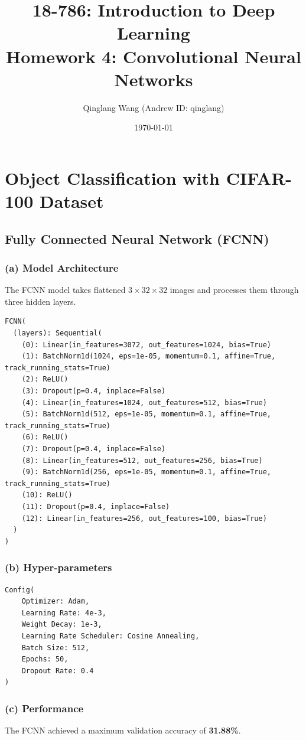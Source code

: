 \documentclass[12pt, a4paper]{article}
\title{18-786: Introduction to Deep Learning \\ Homework 4: Convolutional Neural Networks}
\author{Qinglang Wang (Andrew ID: qinglang)}
\date{\today}
\begin{document}
\maketitle

\section{Object Classification with CIFAR-100 Dataset}

\subsection*{Fully Connected Neural Network (FCNN)}

\subsubsection*{(a) Model Architecture}
The FCNN model takes flattened $3 \times 32 \times 32$ images and processes them through three hidden layers.
\begin{lstlisting}
FCNN(
  (layers): Sequential(
    (0): Linear(in_features=3072, out_features=1024, bias=True)
    (1): BatchNorm1d(1024, eps=1e-05, momentum=0.1, affine=True, track_running_stats=True)
    (2): ReLU()
    (3): Dropout(p=0.4, inplace=False)
    (4): Linear(in_features=1024, out_features=512, bias=True)
    (5): BatchNorm1d(512, eps=1e-05, momentum=0.1, affine=True, track_running_stats=True)
    (6): ReLU()
    (7): Dropout(p=0.4, inplace=False)
    (8): Linear(in_features=512, out_features=256, bias=True)
    (9): BatchNorm1d(256, eps=1e-05, momentum=0.1, affine=True, track_running_stats=True)
    (10): ReLU()
    (11): Dropout(p=0.4, inplace=False)
    (12): Linear(in_features=256, out_features=100, bias=True)
  )
)
\end{lstlisting}


\subsubsection*{(b) Hyper-parameters}
\begin{lstlisting}
Config(
    Optimizer: Adam,
    Learning Rate: 4e-3,
    Weight Decay: 1e-3,
    Learning Rate Scheduler: Cosine Annealing,
    Batch Size: 512,
    Epochs: 50,
    Dropout Rate: 0.4
)
\end{lstlisting}

\subsubsection*{(c) Performance}
The FCNN achieved a maximum validation accuracy of \textbf{31.88\%}.
\end{document}
